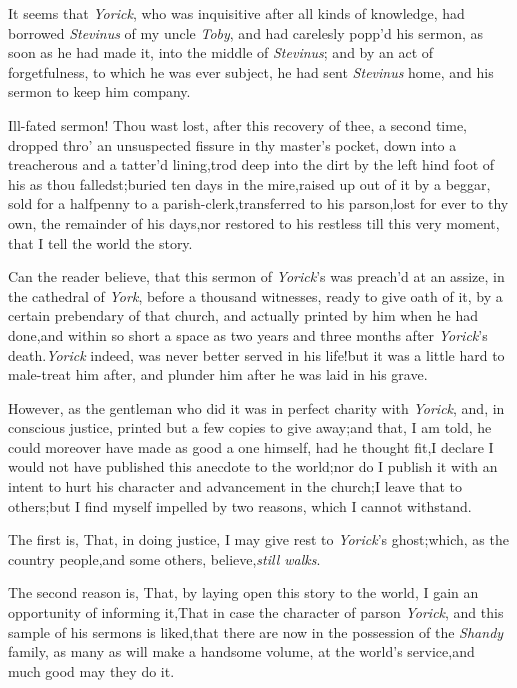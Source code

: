 \documentclass{article}
\begin{document}
It seems that \textit{Yorick}, who was inquisitive after all kinds
of knowledge, had borrowed \textit{Stevinus} of my uncle \textit{Toby},
and had carelesly popp’d his sermon, as soon as he had made it,
into the middle of \textit{Stevinus}; and by an act of forgetfulness,
to which he was ever subject, he had sent \textit{Stevinus} home, and
his sermon to keep him company.

Ill-fated sermon! Thou wast lost, after this recovery of thee, a
second time, dropped thro’ an unsuspected fissure in thy
master’s pocket, down into a treacherous and a tatter’d
lining,\tsk trod deep into the dirt by the left hind foot of
his  as thou
falledst;\tsk buried ten days in the mire,\tsh raised up
out of it by a beggar, sold for a halfpenny to a
parish-clerk,\tsk\break transferred to his
parson,\tsh lost for ever to thy own, the remainder of his
days,\tsk\break nor restored to his restless  till
this very moment, that I tell the world the story.

Can the reader believe, that this sermon of
\textit{Yorick}’s was preach’d at an assize, in the cathedral
of \textit{York}, before a thousand witnesses, ready to give oath of
it, by a certain prebendary of that church, and actually printed by
him when he had done,\tsh and within so short a space as
two years and three months after \textit{Yorick}’s
death.\tsk \textit{Yorick} indeed, was never better served in his
life!\tsh but it was a little hard to male-treat him after,
and plunder him after he was laid in his grave.

However, as the gentleman who did it was in perfect charity with
\textit{Yorick},\tsk\break
and, in conscious justice, printed but a
few copies to give away;\tsk and that, I am told, he could
moreover have made as good a one himself, had he thought
fit,\break \tsk I declare I would not have published this
anecdote to the world;\tsk nor do I publish it with an intent to
hurt his character and advancement in the church;\tsk\break I
leave that to others;\tsh but I find myself impelled by two
reasons, which I cannot withstand.

The first is, That, in doing justice, I may give rest to
\textit{Yorick}’s ghost;\tsk which,\break
as the country people,\tsk and some others,\break
believe,\tsh \textit{still walks}.

The second reason is, That, by laying open this story to the
world, I gain an opportunity of informing it,\tsk That in case
the character of parson \textit{Yorick}, and this sample of his
sermons is liked,\tsh that
there are now in the possession of
the \textit{Shandy} family, as many as will make a handsome volume,
at the world’s service,\tsh and much good may they\break
do it.
\end{document}
